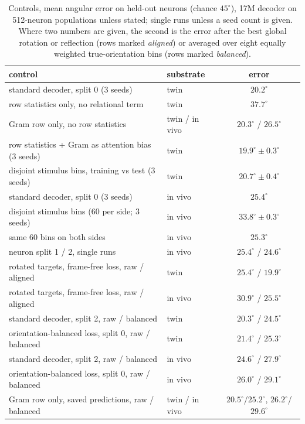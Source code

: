 \documentclass[11pt]{article}
\begin{document}
\begin{table}[htbp]
  \centering\footnotesize
  \caption{Controls, mean angular error on held-out neurons (chance $45^\circ$), 17M decoder on 512-neuron populations unless stated; single runs unless a seed count is given. Where two numbers are given, the second is the error after the best global rotation or reflection (rows marked \emph{aligned}) or averaged over eight equally weighted true-orientation bins (rows marked \emph{balanced}).}
  \label{tab:controls}
  \begin{tabular}{llc}
    \toprule
    control & substrate & error \\
    \midrule
    standard decoder, split 0 (3 seeds) & twin & $20.2^\circ$ \\
    row statistics only, no relational term & twin & $37.7^\circ$ \\
    Gram row only, no row statistics & twin / in vivo & $20.3^\circ$ / $26.5^\circ$ \\
    row statistics + Gram as attention bias (3 seeds) & twin & $19.9^\circ \pm 0.3^\circ$ \\
    disjoint stimulus bins, training vs test (3 seeds) & twin & $20.7^\circ \pm 0.4^\circ$ \\
    standard decoder, split 0 (3 seeds) & in vivo & $25.4^\circ$ \\
    disjoint stimulus bins (60 per side; 3 seeds) & in vivo & $33.8^\circ \pm 0.3^\circ$ \\
    same 60 bins on both sides & in vivo & $25.3^\circ$ \\
    neuron split 1 / 2, single runs & in vivo & $25.4^\circ$ / $24.6^\circ$ \\
    rotated targets, frame-free loss, raw / aligned & twin & $25.4^\circ$ / $19.9^\circ$ \\
    rotated targets, frame-free loss, raw / aligned & in vivo & $30.9^\circ$ / $25.5^\circ$ \\
    standard decoder, split 2, raw / balanced & twin & $20.3^\circ$ / $24.5^\circ$ \\
    orientation-balanced loss, split 0, raw / balanced & twin & $21.4^\circ$ / $25.3^\circ$ \\
    standard decoder, split 2, raw / balanced & in vivo & $24.6^\circ$ / $27.9^\circ$ \\
    orientation-balanced loss, split 0, raw / balanced & in vivo & $26.0^\circ$ / $29.1^\circ$ \\
    Gram row only, saved predictions, raw / balanced & twin / in vivo & $20.5^\circ$/$25.2^\circ$, $26.2^\circ$/$29.6^\circ$ \\

\end{tabular}
\end{table}
\end{document}
